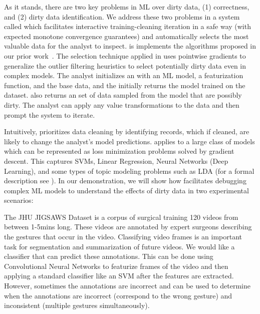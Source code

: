 As it stands, there are two key problems in ML over dirty data, (1) correctness, and (2) dirty data identification.
We address these two problems in a system called \sys which facilitates interactive training-cleaning iteration in a safe way (with expected monotone convergence guarantees) and automatically selects the most valuable data for the analyst to inspect.
\sys is implements the algorithms proposed in our prior work~\cite{activecleanarxiv}.
The selection technique applied in \sys uses pointwise gradients to generalize the outlier filtering heuristics to select potentially dirty data even in complex models. 
The analyst initializes an \sys with an ML model, a featurization function, and the base data, and the \sys initially returns the model trained on the dataset.
\sys also returns an set of data sampled from the model that are possibly dirty.
The analyst can apply any value transformations to the data and then prompt the system to iterate. 

Intuitively, \sys prioritizes data cleaning by identifying records, which if cleaned, are likely to change the analyst's model predictions.
\sys applies to a large class of models which can be represented as loss minimization problems solved by gradient descent.
This captures SVMs, Linear Regression, Neural Networks (Deep Learning), and some types of topic modeling problems such as LDA (for a formal description see \cite{activecleanarxiv}).
In our demonstration, we will show how \sys facilitates debugging complex ML models to understand the effects of dirty data in two experimental scenarios: 

\begin{example}\sloppy
The JHU JIGSAWS Dataset is a corpus of surgical training 120 videos from between 1-5mins long.
These videos are annotated by expert surgeons describing the gestures that occur in the video. 
Classifying video frames is an important task for segmentation and summarization of future videos.
We would like a classifier that can predict these annotations.
This can be done using Convolutional Neural Networks to featurize frames of the video and then applying a standard classifier like an SVM after the features are extracted.
However, sometimes the annotations are incorrect and \sys can be used to determine when the annotations are incorrect (correspond to the wrong gesture) and inconsistent (multiple gestures simultaneously).
\end{example}

